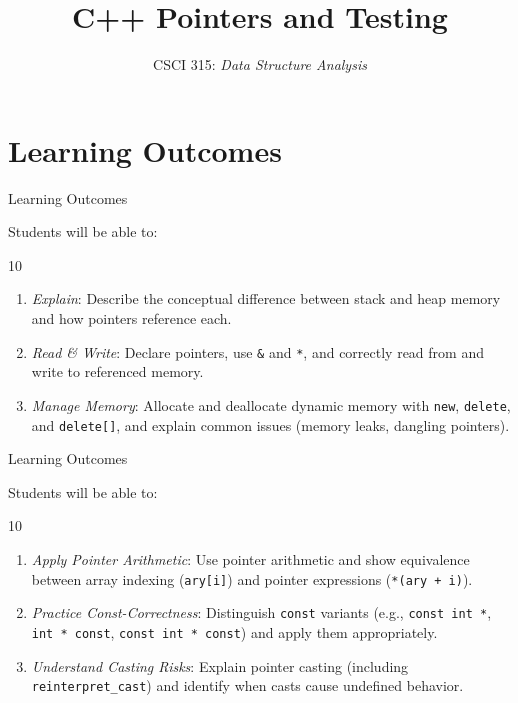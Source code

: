 \documentclass[14pt,aspectratio=1610]{beamer}
\title{\Huge{}{\ttfamily\bfseries C++} Pointers and Testing}
\subtitle{CSCI 315: \textit{Data Structure Analysis}}
\institute{Charleston Southern University}
\begin{document}
\begin{frame}
  \titlepage{}
\end{frame}

\section*{Learning Outcomes}

\begin{frame}{Learning Outcomes}

Students will be able to:
\begin{overlayarea}{\linewidth}{10\baselineskip}
\begin{enumerate}
  \item \emph{Explain}: Describe the conceptual difference between stack and heap memory and how pointers reference each.
  \item \emph{Read \& Write}: Declare pointers, use \lstinline{&} and \lstinline{*}, and correctly read from and write to referenced memory.
  \item \emph{Manage Memory}: Allocate and deallocate dynamic memory with \lstinline{new}, \lstinline{delete}, and \lstinline{delete[]}, and explain common issues (memory leaks, dangling pointers).
\end{enumerate}
\end{overlayarea}
\end{frame}

\begin{frame}{Learning Outcomes}

Students will be able to:
\begin{overlayarea}{\linewidth}{10\baselineskip}
\begin{enumerate}\addtocounter{enumi}{3}
  \item \emph{Apply Pointer Arithmetic}: Use pointer arithmetic and show equivalence between array indexing (\lstinline{ary[i]}) and pointer expressions (\lstinline{*(ary + i)}).
  \item \emph{Practice Const-Correctness}: Distinguish \lstinline{const} variants (e.g., \lstinline{const int *}, \lstinline{int * const}, \lstinline{const int * const}) and apply them appropriately.
  \item \emph{Understand Casting Risks}: Explain pointer casting (including \lstinline{reinterpret_cast}) and identify when casts cause undefined behavior.
\end{enumerate}
\end{overlayarea}
\end{frame}
\end{document}

